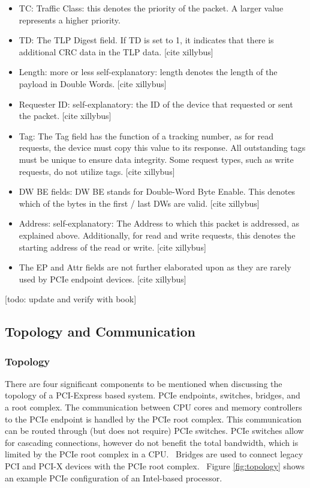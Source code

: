 \begin{itemize}
\item TC: Traffic Class: this denotes the priority of the packet. A larger value represents a higher priority.~\parencite{jackson_pci_2012}
\item TD: The TLP Digest field. If TD is set to 1, it indicates that there is additional CRC data in the TLP data. [cite xillybus]
\item Length: more or less self-explanatory: length denotes the length of the payload in Double Words. [cite xillybus]
\item Requester ID: self-explanatory: the ID of the device that requested or sent the packet. [cite xillybus]
\item Tag: The Tag field has the function of a tracking number, as for read requests, the device must copy this value to its response. All outstanding tags must be unique to ensure data integrity. Some request types, such as write requests, do not utilize tags. [cite xillybus]
\item DW BE fields: DW BE stands for Double-Word Byte Enable. This denotes which of the bytes in the first / last DWs are valid. [cite xillybus]
\item Address: self-explanatory: The Address to which this packet is addressed, as explained above. Additionally, for read and write requests, this denotes the starting address of the read or write. [cite xillybus]
\item The EP and Attr fields are not further elaborated upon as they are rarely used by PCIe endpoint devices. [cite xillybus]
\end{itemize}

[todo: update and verify with book]

\subsection{Topology and Communication}

\subsubsection{Topology}
There are four significant components to be mentioned when discussing the topology of a PCI-Express based system. PCIe endpoints, switches, bridges, and a root complex. 
The communication between CPU cores and memory controllers to the PCIe endpoint is handled by the PCIe root complex. This communication can be routed through (but does not require) PCIe switches. PCIe switches allow for cascading connections, however do not benefit the total bandwidth, which is limited by the PCIe root complex in a CPU.~\parencite{nakamura_thorough_2017}
Bridges are used to connect legacy PCI and PCI-X devices with the PCIe root complex.~\parencite{pci-sig_pci_2011}
Figure \ref{fig:topology} shows an example PCIe configuration of an Intel-based processor.

